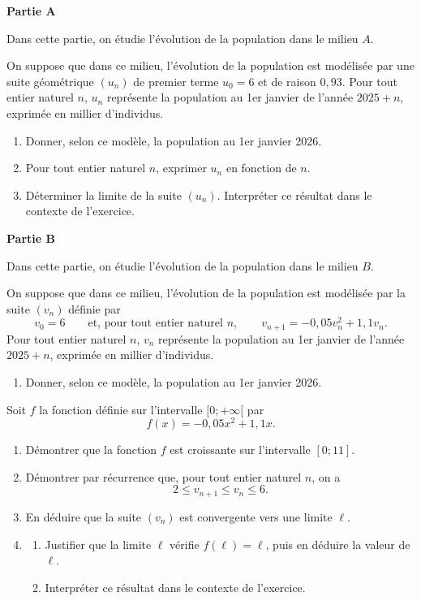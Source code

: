 \documentclass[11pt,a4paper]{article}
\begin{document}
\textbf{Partie A}

Dans cette partie, on étudie l'évolution de la population dans le milieu $A$.

On suppose que dans ce milieu, l'évolution de la population est modélisée par une suite géométrique $(u_n)$ de premier terme $u_0=6$ et de raison $0{,}93$.
Pour tout entier naturel $n$, $u_n$ représente la population au 1er janvier de l'année $2025+n$, exprimée en millier d'individus.

\begin{enumerate}
  \item Donner, selon ce modèle, la population au 1er janvier 2026.
  \item Pour tout entier naturel $n$, exprimer $u_n$ en fonction de $n$.
  \item Déterminer la limite de la suite $(u_n)$. Interpréter ce résultat dans le contexte de l'exercice.
\end{enumerate}

\textbf{Partie B}

Dans cette partie, on étudie l'évolution de la population dans le milieu $B$.

On suppose que dans ce milieu, l'évolution de la population est modélisée par la suite $(v_n)$ définie par
\[
v_0=6\qquad\text{et, pour tout entier naturel }n,\qquad v_{n+1}=-0{,}05v_n^2+1{,}1v_n.
\]
Pour tout entier naturel $n$, $v_n$ représente la population au 1er janvier de l'année $2025+n$, exprimée en millier d'individus.

\begin{enumerate}
  \item Donner, selon ce modèle, la population au 1er janvier 2026.
\end{enumerate}
Soit $f$ la fonction définie sur l'intervalle $[0;+\infty[$ par
\[
f(x)=-0{,}05x^2+1{,}1x.
\]
\begin{enumerate}[resume]
  \item Démontrer que la fonction $f$ est croissante sur l'intervalle $[0;11]$.
  \item Démontrer par récurrence que, pour tout entier naturel $n$, on a
  \[
  2\leqslant v_{n+1}\leqslant v_n\leqslant 6.
  \]
  \item En déduire que la suite $(v_n)$ est convergente vers une limite $\ell$.
  \item
  \begin{enumerate}
    \item Justifier que la limite $\ell$ vérifie $f(\ell)=\ell$, puis en déduire la valeur de $\ell$.
    \item Interpréter ce résultat dans le contexte de l'exercice.
  \end{enumerate}
\end{enumerate}
\end{document}
